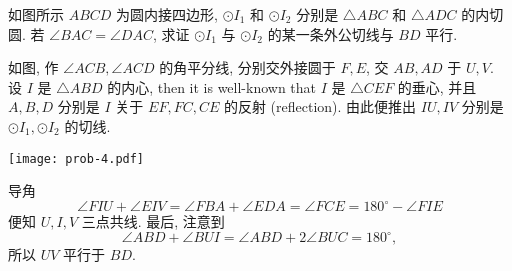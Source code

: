 \begin{prob}
\label{prob:prob-4}
如图所示 $ABCD$ 为圆内接四边形, $\odot I_1$ 和 $\odot I_2$
分别是 $\triangle ABC$ 和 $\triangle ADC$ 的内切圆.
若 $\angle BAC = \angle DAC$,
求证 $\odot I_1$ 与 $\odot I_2$ 的某一条外公切线与 $BD$ 平行.
\end{prob}


\begin{soln}
如图, 作 $\angle ACB, \angle ACD$ 的角平分线,
分别交外接圆于 $F, E$, 交 $AB, AD$ 于 $U, V$.
设 $I$ 是 $\triangle ABD$ 的内心,
then it is well-known that $I$ 是 $\triangle CEF$ 的垂心,
并且 $A, B, D$ 分别是 $I$ 关于 $EF, FC, CE$ 的反射 (reflection).
由此便推出 $IU, IV$ 分别是 $\odot I_1, \odot I_2$ 的切线.

\begin{center}
\texttt{[image: prob-4.pdf]}
\end{center}

导角
\[
\angle FIU + \angle EIV = \angle FBA + \angle EDA
= \angle FCE = 180^\circ - \angle FIE
\]
便知 $U, I, V$ 三点共线. 最后,
注意到
\[
\angle ABD + \angle BUI = \angle ABD + 2 \angle BUC = 180^\circ,
\]
所以 $UV$ 平行于 $BD$.
\end{soln}
